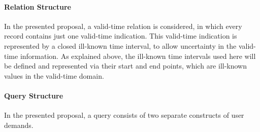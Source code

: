 


\paragraph{\textbf{Relation Structure}}
In the presented proposal, a valid-time relation is considered, in which every record contains just one valid-time indication. This valid-time indication is represented by a closed ill-known time interval, to allow uncertainty in the valid-time information. As explained above, the ill-known time intervals used here will be defined and represented via their start and end points, which are ill-known values in the valid-time domain.

\paragraph{\textbf{Query Structure}}
In the presented proposal, a query consists of two separate constructs of user demands.


